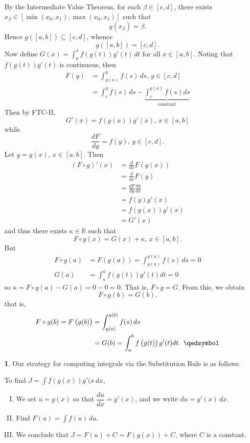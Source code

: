 \documentclass[11pt]{article}
\theoremstyle{definition}
\newtheorem{none}[thm]{}
\newcommand{\mbR}{\ensuremath{\mathbb{R}}}
\begin{document}
By the Intermediate Value Theorem, for each $\beta \in [c, d]$, there exists $x_{\beta} \in [\min(x_0, x_1), \max(x_0, x_1)]$ such that
$$g(x_{\beta}) = \beta \text{.}$$
Hence $g([a, b]) \subseteq [c, d]$, whence
$$g([a, b]) = [c, d] \text{.}$$
Now define $G(x) = \displaystyle\int_a^x f\left(g(t)\right)g'(t)\,dt$ for all $x \in [a, b]$. Noting that $f\left(g(t)\right)g'(t)$ is continuous, then
\begin{align*}
F(y) & = \int_{g(a)}^y f(s)\,ds, \hspace{2pt} y \in [c, d] \\
& = \int_c^y f(s)\,ds - \underbrace{\int_c^{g(a)} f(s)ds}_{\text{constant}}
\end{align*}
Then by FTC-II,
$$G'(x) = f\left(g(x)\right)g'(x), \hspace{2pt} x \in [a, b]$$
while
$$\frac{dF}{dy} = f(y), \hspace{2pt} y \in [c, d] \text{.}$$
Let $y = g(x)$, $x \in [a, b]$. Then
\begin{align*}
(F \circ g)'(x) & = \frac{d}{dx} F\left(g(x)\right) \\
& = \frac{d}{dx} F(y) \\
& = \frac{dF}{dy} \frac{dy}{dx} \\
& = f(y) g'(x) \\
& = f\left(g(x)\right)g'(x) \\
& = G'(x)
\end{align*}
and thus there exists $\kappa \in \mbR$ such that
$$F \circ g(x) = G(x) + \kappa, \hspace{2pt} x \in [a, b] \text{.}$$
But 
\begin{align*}
F \circ g(a) & = F\left(g(a)\right) = \displaystyle\int_{g(a)}^{g(a)} f(s)\,ds = 0 \\
G(a) & = \displaystyle\int_a^a f\left(g(t)\right)g'(t)dt = 0
\end{align*}
so $\kappa = F\circ g(a) - G(a) = 0 - 0 = 0$. That is, $F \circ g = G$. From this, we obtain
$$F \circ g(b) = G(b) \text{,}$$
that is,
\begin{align*}
F \circ g(b) = F\left(g(b)\right) & = \int_{g(a)}^{g(b)} f(s)\,ds  \\
& = G(b) = \int_a^b f\left(g(t)\right)g'(t)dt \text{. } \qedsymbol
\end{align*}

\begin{none}
Our strategy for computing integrals via the Substitution Rule is as follows. 

To find $J = \displaystyle\int f\left(g(x)\right)g'(x\,dx$,
\begin{enumerate}[(I)] \vspace{-0.2cm}
\item We set $u = g(x)$ so that $\dfrac{du}{dx} = g'(x)$, and we write $du = g'(x)\,dx$. 
\item Find $F(u) = \displaystyle\int f(u)\,du$.
\item We conclude that $J = F(u) + C = F\left(g(x)\right)+C$, where $C$ is a constant.
\end{enumerate}
\end{none}
\end{document}
